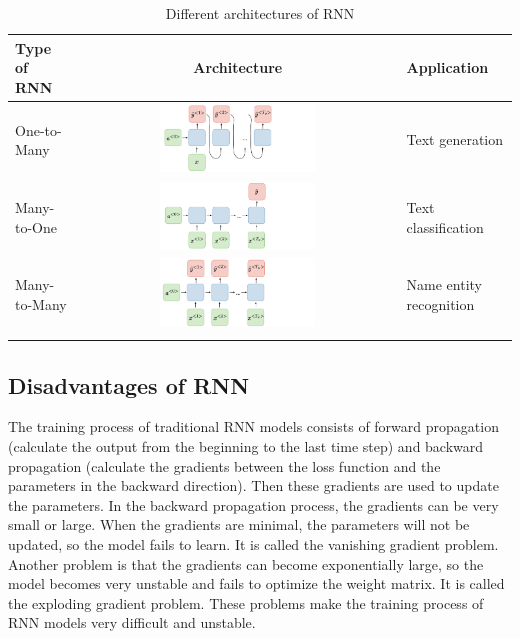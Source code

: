 \begin{longtable}[ht]{| l | c | l |}
    \hline
    Type of RNN & Architecture & Application \\
    \hline
    One-to-Many & \includegraphics[width=0.5\textwidth]{Images/5.Theoretical_Background/rnn_one_to_many.png} & Text generation \\
    \hline
    Many-to-One & \includegraphics[width=0.5\textwidth]{Images/5.Theoretical_Background/rnn_many_to_one.png} & Text classification \\
    \hline
    Many-to-Many & \includegraphics[width=0.5\textwidth]{Images/5.Theoretical_Background/rnn_many_to_many.png} & Name entity recognition \\
    \hline
    \caption{Different architectures of RNN}
    \label{tab:rnn_architecture}
\end{longtable}

\subsection{Disadvantages of RNN}
The training process of traditional RNN models consists of forward propagation (calculate the output from the beginning to the last time step) and backward propagation (calculate the gradients between the loss function and the parameters in the backward direction). Then these gradients are used to update the parameters. In the backward propagation process, the gradients can be very small or large. When the gradients are minimal, the parameters will not be updated, so the model fails to learn. It is called the vanishing gradient problem. Another problem is that the gradients can become exponentially large, so the model becomes very unstable and fails to optimize the weight matrix. It is called the exploding gradient problem. These problems make the training process of RNN models very difficult and unstable.

